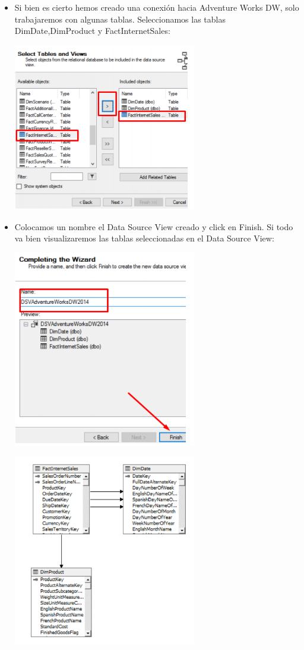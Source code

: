 \begin{itemize}
\begin{center}
\end{center}
	 \item Si bien es cierto hemos creado una conexión hacia Adventure Works DW, solo trabajaremos con algunas tablas. Seleccionamos las tablas DimDate,DimProduct y FactInternetSales:
\begin{center}
	\includegraphics[width=8cm]{./Imagenes/img12}
\end{center}

	 \item Colocamos un nombre el Data Source View creado y click en Finish. Si todo va bien visualizaremos las tablas seleccionadas en el Data Source View:
\begin{center}
	\includegraphics[width=8cm]{./Imagenes/img13}
\end{center}
\begin{center}
	\includegraphics[width=8cm]{./Imagenes/img14}
\end{center}



\end{itemize}
